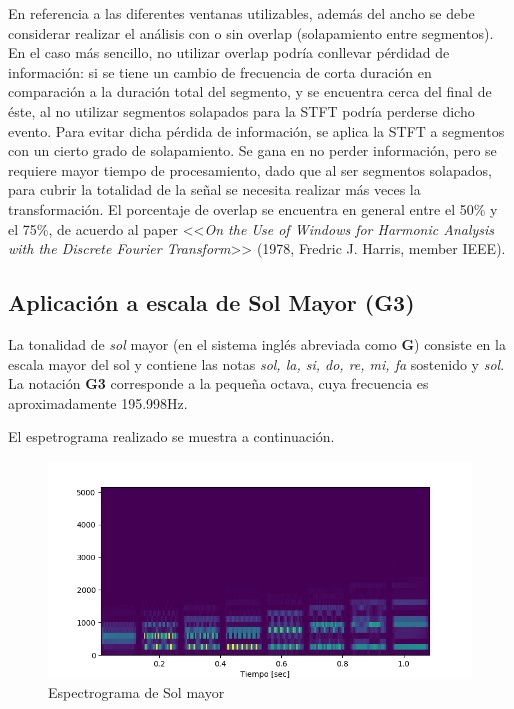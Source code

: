 \documentclass[assd_tp2_main.tex]{subfiles}
\begin{document}
En referencia a las diferentes ventanas utilizables, adem\'as del ancho se debe considerar realizar el an\'alisis con o sin overlap (solapamiento entre segmentos). En el caso m\'as sencillo, no utilizar overlap podr\'ia conllevar p\'erdidad de informaci\'on: si se tiene un cambio de frecuencia de corta duraci\'on en comparaci\'on a la duraci\'on total del segmento, y se encuentra cerca del final de \'este, al no utilizar segmentos solapados para la STFT podr\'ia perderse dicho evento. Para evitar dicha p\'erdida de informaci\'on, se aplica la STFT a segmentos con un cierto grado de solapamiento. Se gana en no perder informaci\'on, pero se requiere mayor tiempo de procesamiento, dado que al ser segmentos solapados, para cubrir la totalidad de la se\~nal se necesita realizar m\'as veces la transformaci\'on. El porcentaje de overlap se encuentra en general entre el 50\% y el 75\%, de acuerdo al paper <<\textit{On the Use of Windows for Harmonic Analysis with the Discrete Fourier Transform}>> (1978, Fredric J. Harris, member IEEE).

\subsection{Aplicaci\'on a escala de Sol Mayor (G3)}

La tonalidad de \textit{sol} mayor (en el sistema ingl\'es abreviada como \textbf{G}) consiste en la escala mayor del sol y contiene las notas \textit{sol, la, si, do, re, mi, fa} sostenido y \textit{sol}. La notaci\'on \textbf{G3} corresponde a la peque\~na octava, cuya frecuencia es aproximadamente 195.998Hz.\par
El espetrograma realizado se muestra a continuaci\'on.

\begin{figure}[ht]	
\begin{centering}
	\includegraphics[scale=0.7]{graficos/Espectrograma7.png}
	\caption{Espectrograma de Sol mayor}
	\end{centering}\par
\end{figure}
\end{document}
